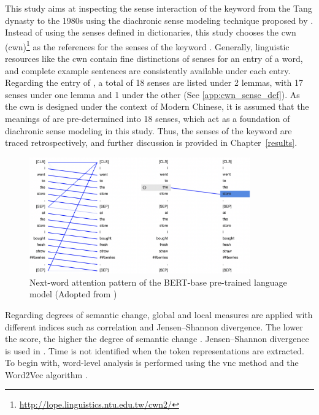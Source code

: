This study aims at inspecting the sense interaction of the keyword \jia from the Tang dynasty to the 1980s using the diachronic sense modeling technique proposed by \textcite{hu2019diachronic}. Instead of using the senses defined in dictionaries, this study chooses the \acrlong{cwn} (\acrshort{cwn})\footnote{\url{http://lope.linguistics.ntu.edu.tw/cwn2/}} \parencite{huang2010infrastructure} as the references for the senses of the keyword \jia\rspace . Generally, linguistic resources like the \gls{cwn} contain fine distinctions of senses for an entry of a word, and complete example sentences are consistently available under each entry. Regarding the entry of \jia\rspace , a total of 18 senses are listed under 2 lemmas, with 17 senses under one lemma and 1 under the other (See \ref{app:cwn_sense_def}). As the \gls{cwn} is designed under the context of Modern Chinese, it is assumed that the meanings of \jia are pre-determined into 18 senses, which act as a foundation of diachronic sense modeling in this study. Thus, the senses of the keyword \jia are traced retrospectively, and further discussion is provided in Chapter~\ref{results}.

\begin{figure}[H]
  \centering
  \includegraphics[height=0.4\textheight,width=0.85\textwidth,keepaspectratio]{figures_ref/bertviz_next_word.png}
  \caption{Next-word attention pattern of the BERT-base pre-trained language model (Adopted from \textcite{vig2019multiscale})}
  \label{fig:bertviz_next_word}
\end{figure}

Regarding degrees of semantic change, global and local measures are applied with different indices such as correlation and Jensen–Shannon divergence. The lower the score, the higher the degree of semantic change \parencite{hamilton2016law}. Jensen–Shannon divergence is used in \textcite{giulianelli2019lexical}. Time is not identified when the token representations are extracted. To begin with, word-level analysis is performed using the \gls{vnc} method \parencite{gries2012variability} and the Word2Vec algorithm \parencite{mikolov2013efficient}.


